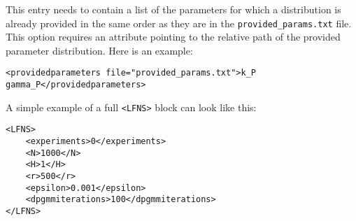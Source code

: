 \documentclass[11pt]{article} %
\begin{document}
\begin{description}
This entry needs to contain a list of the parameters for which a distribution is already provided in the same order as they are in the \texttt{provided\_params.txt} file. This option requires an attribute pointing to the relative path of the provided parameter distribution. Here is an example: 
\begin{tcolorbox}
\begin{verbatim}
<providedparameters file="provided_params.txt">k_P gamma_P</providedparameters>
\end{verbatim}
\end{tcolorbox}
\end{description}
A simple example of a full \texttt{<LFNS>} block can look like this: 
\begin{tcolorbox}
\begin{verbatim}
<LFNS>
    <experiments>0</experiments>
    <N>1000</N>
    <H>1</H>
    <r>500</r>
    <epsilon>0.001</epsilon>
    <dpgmmiterations>100</dpgmmiterations>
</LFNS>
\end{verbatim}
\end{tcolorbox}

%


\end{document}
